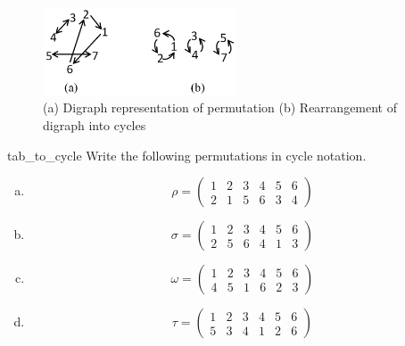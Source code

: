 \begin{figure}[ht]
\begin{center}
\includegraphics[width=2.25in]{images/cycle_rep.png}
\caption{(a) Digraph representation of permutation (b) Rearrangement of digraph into cycles}\label{permute:cycle_rep}
\end{center}
\end{figure}


\begin{exercise}{tab_to_cycle}
Write the following permutations in cycle notation.
\begin{multicols}{2}
\begin{enumerate}[(a)]
 
\item
\[ \rho =
\begin{pmatrix}
1 & 2 & 3 & 4 & 5 & 6  \\
2 & 1 & 5 & 6 & 3 & 4 
\end{pmatrix}
\]

\item
\[ \sigma =
\begin{pmatrix}
1 & 2 & 3 & 4 & 5 & 6\\
2 & 5 & 6 & 4 & 1 & 3
\end{pmatrix}
\]

\item
\[ \omega =
\begin{pmatrix}
1 & 2 & 3 & 4 & 5 & 6 \\
4 & 5 & 1 & 6 & 2 & 3
\end{pmatrix}
\]

\item
\[ \tau =
\begin{pmatrix}
1 & 2 & 3 & 4 & 5 & 6 \\
5 & 3 & 4 & 1 & 2 & 6
\end{pmatrix}
\]

\end{enumerate}
\end{multicols}
\end{exercise}

